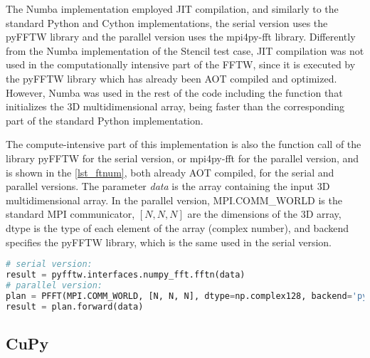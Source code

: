 The Numba implementation employed JIT compilation, and similarly to the standard Python and Cython implementations, the serial version uses the pyFFTW library and the parallel version uses the mpi4py-fft library. Differently from the Numba implementation of the Stencil test case, JIT compilation was not used in the computationally intensive part of the FFTW, since it is executed by the pyFFTW library which has already been AOT compiled and optimized. However, Numba was used in the rest of the code including the function that initializes the 3D multidimensional array, being faster than the corresponding part of the standard Python implementation.

The compute-intensive part of this implementation is also the function call of the library pyFFTW for the serial version, or mpi4py-fft for the parallel version, and is shown in the \autoref {lst_ftnum}, both already AOT compiled, for the serial and parallel versions. The parameter \textit {data} is the array containing the input 3D multidimensional array. In the parallel version, MPI.COMM\_WORLD is the standard MPI communicator, $[N,N,N]$ are the dimensions of the 3D array, dtype is the type of each element of the array (complex number), and backend specifies the pyFFTW library, which is the same used in the serial version.

\begin{lstlisting}[float=hbt, language=Python, label={lst_ftnum}, caption={Compute-intensive part of the FFT test case Numba code.}]
# serial version:
result = pyfftw.interfaces.numpy_fft.fftn(data)
# parallel version:
plan = PFFT(MPI.COMM_WORLD, [N, N, N], dtype=np.complex128, backend='pyfftw')
result = plan.forward(data)
\end{lstlisting}

%
%
%
\subsection{CuPy} %
\label{sec_fftimplngpu}


